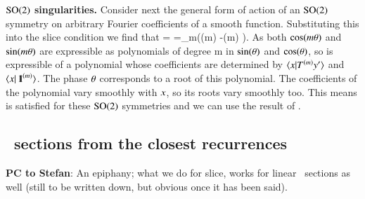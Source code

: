 \noindent
{\bf $\textrm{SO}(2)$ singularities.}
\label{ex:so2singularities}
Consider next the general form  of action
of an $\textrm{SO}(2)$ symmetry on arbitrary Fourier coefficients of a smooth
function.
Substituting this into the slice condition  we find that
\bea
{}
=
\continue
=\sum\limits_m(\cos(m\gSpace) -\sin(m\gSpace) ).
\label{eq:so2sing}
\eea
As both $\cos(m{\bf \theta})$ and $\sin(m{\bf \theta})$ are expressible as
polynomials of degree m in $\sin({\bf \theta})$ and $\cos({\bf \theta})$, so
 is expressible of a polynomial whose coefficients are
determined by $\braket{\ssp}{\Lg^{(m)} \slicep}$ and
$\braket{\ssp}{\id^{(m)}}$.
The phase ${\bf \theta}$ corresponds to a root of this polynomial. The
coefficients of the polynomial vary smoothly with $x$, so its roots
vary smoothly too. This means  is satisfied for these
$\textrm{SO}(2)$ symmetries and we can use the result of .



\ifboyscout
\subsection{\Poincare\ sections from the closest recurrences}
    {\color{red} {\bf PC to Stefan}:
An epiphany; what we do for slice, works for linear \Poincare\ sections
as well (still to be written down, but obvious once it has been said).
   }
\else
\fi

\subsubsection{}



%
